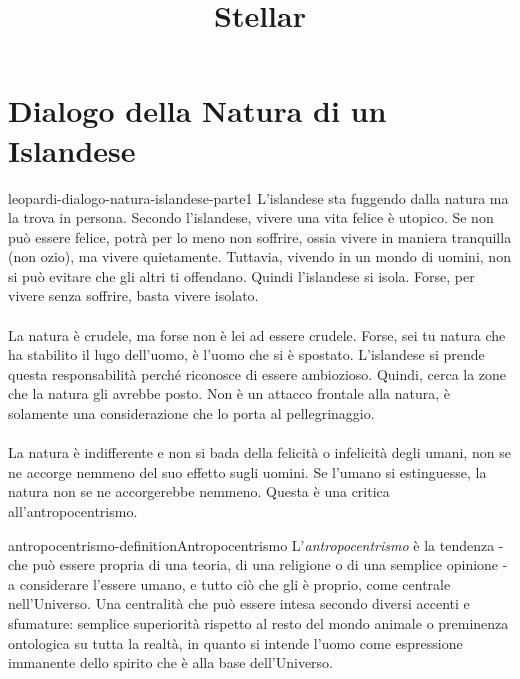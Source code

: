 \documentclass[preview]{standalone}
\begin{document}
\title{Stellar}
\genpage

\section{Dialogo della Natura di un Islandese}


\begin{snippet}{leopardi-dialogo-natura-islandese-parte1}
    L'islandese sta fuggendo dalla natura ma la trova in persona.
    Secondo l'islandese, vivere una vita felice è utopico.
    Se non può essere felice, potrà per lo meno non soffrire,
    ossia vivere in maniera tranquilla (non ozio), ma vivere quietamente.
    Tuttavia, vivendo in un mondo di uomini, non si può evitare 
    che gli altri ti offendano.
    Quindi l'islandese si isola.
    Forse, per vivere senza soffrire, basta vivere isolato.
    \\\\
    La natura è crudele, ma forse non è lei ad essere crudele.
    Forse, sei tu natura che ha stabilito il lugo dell'uomo,
    è l'uomo che si è spostato. L'islandese si prende questa responsabilità perché
    riconosce di essere ambiozioso. Quindi, cerca la zone che la natura gli avrebbe posto.
    Non è un attacco frontale alla natura, è solamente una considerazione
    che lo porta al pellegrinaggio.
    \\\\
    La natura è indifferente e non si bada della felicità o infelicità
    degli umani, non se ne accorge nemmeno del suo effetto sugli uomini.
    Se l'umano si estinguesse, la natura non se ne accorgerebbe nemmeno.
    Questa è una critica all'antropocentrismo.
\end{snippet}

\begin{snippetdefinition}{antropocentrismo-definition}{Antropocentrismo}
    L'\textit{antropocentrismo} è la tendenza -
    che può essere propria di una teoria, di una religione o di una semplice opinione -
    a considerare l'essere umano, e tutto ciò che gli è proprio,
    come centrale nell'Universo.
    Una centralità che può essere intesa secondo diversi accenti e sfumature:
    semplice superiorità rispetto al resto del mondo animale o preminenza ontologica su
    tutta la realtà, in quanto si intende l'uomo come espressione immanente
    dello spirito che è alla base dell'Universo. 
\end{snippetdefinition}
\end{document}
